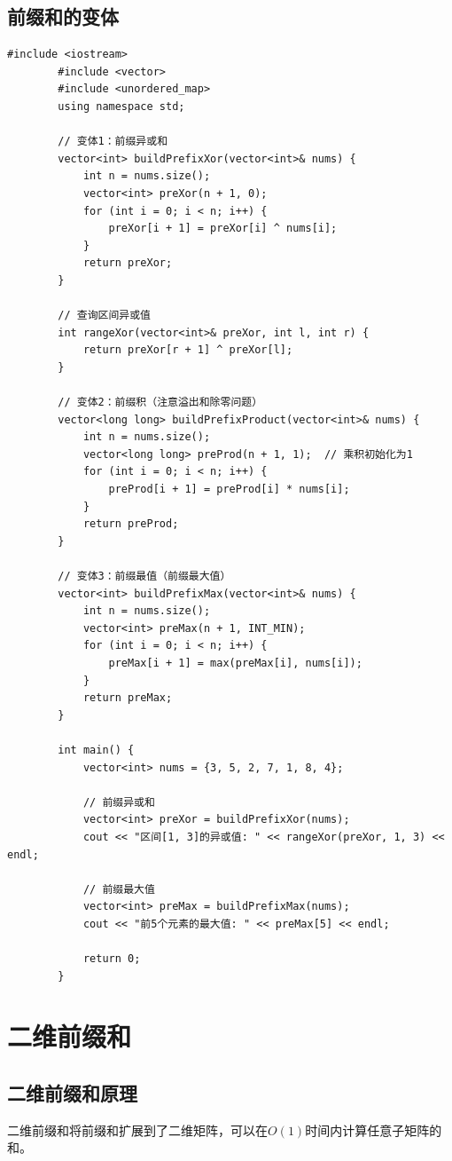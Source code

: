 \documentclass[12pt,a4paper]{article}
\begin{document}
	\subsection{前缀和的变体}
	
	\begin{lstlisting}[caption={前缀和变体 - 多种应用}]
		#include <iostream>
		#include <vector>
		#include <unordered_map>
		using namespace std;
		
		// 变体1：前缀异或和
		vector<int> buildPrefixXor(vector<int>& nums) {
			int n = nums.size();
			vector<int> preXor(n + 1, 0);
			for (int i = 0; i < n; i++) {
				preXor[i + 1] = preXor[i] ^ nums[i];
			}
			return preXor;
		}
		
		// 查询区间异或值
		int rangeXor(vector<int>& preXor, int l, int r) {
			return preXor[r + 1] ^ preXor[l];
		}
		
		// 变体2：前缀积（注意溢出和除零问题）
		vector<long long> buildPrefixProduct(vector<int>& nums) {
			int n = nums.size();
			vector<long long> preProd(n + 1, 1);  // 乘积初始化为1
			for (int i = 0; i < n; i++) {
				preProd[i + 1] = preProd[i] * nums[i];
			}
			return preProd;
		}
		
		// 变体3：前缀最值（前缀最大值）
		vector<int> buildPrefixMax(vector<int>& nums) {
			int n = nums.size();
			vector<int> preMax(n + 1, INT_MIN);
			for (int i = 0; i < n; i++) {
				preMax[i + 1] = max(preMax[i], nums[i]);
			}
			return preMax;
		}
		
		int main() {
			vector<int> nums = {3, 5, 2, 7, 1, 8, 4};
			
			// 前缀异或和
			vector<int> preXor = buildPrefixXor(nums);
			cout << "区间[1, 3]的异或值: " << rangeXor(preXor, 1, 3) << endl;
			
			// 前缀最大值
			vector<int> preMax = buildPrefixMax(nums);
			cout << "前5个元素的最大值: " << preMax[5] << endl;
			
			return 0;
		}
	\end{lstlisting}
	
	\section{二维前缀和}
	
	\subsection{二维前缀和原理}
	
	二维前缀和将前缀和扩展到了二维矩阵，可以在$O(1)$时间内计算任意子矩阵的和。
	
\end{document}
